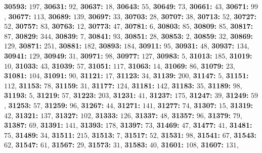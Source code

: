 \textsf{\bfseries 30593:} $197$, \textsf{\bfseries 30631:} $92$, \textsf{\bfseries 30637:} $18$, \textsf{\bfseries 30643:} $55$, \textsf{\bfseries 30649:} $73$, \textsf{\bfseries 30661:} $43$, \textsf{\bfseries 30671:} $99$, \textsf{\bfseries 30677:} $113$, \textsf{\bfseries 30689:} $139$, \textsf{\bfseries 30697:} $33$, \textsf{\bfseries 30703:} $28$, \textsf{\bfseries 30707:} $38$, \textsf{\bfseries 30713:} $52$, \textsf{\bfseries 30727:} $52$, \textsf{\bfseries 30757:} $83$, \textsf{\bfseries 30763:} $12$, \textsf{\bfseries 30773:} $47$, \textsf{\bfseries 30781:} $6$, \textsf{\bfseries 30803:} $85$, \textsf{\bfseries 30809:} $85$, \textsf{\bfseries 30817:} $87$, \textsf{\bfseries 30829:} $344$, \textsf{\bfseries 30839:} $7$, \textsf{\bfseries 30841:} $93$, \textsf{\bfseries 30851:} $28$, \textsf{\bfseries 30853:} $2$, \textsf{\bfseries 30859:} $32$, \textsf{\bfseries 30869:} $129$, \textsf{\bfseries 30871:} $251$, \textsf{\bfseries 30881:} $182$, \textsf{\bfseries 30893:} $184$, \textsf{\bfseries 30911:} $95$, \textsf{\bfseries 30931:} $48$, \textsf{\bfseries 30937:} $134$, \textsf{\bfseries 30941:} $129$, \textsf{\bfseries 30949:} $31$, \textsf{\bfseries 30971:} $98$, \textsf{\bfseries 30977:} $127$, \textsf{\bfseries 30983:} $5$, \textsf{\bfseries 31013:} $185$, \textsf{\bfseries 31019:} $10$, \textsf{\bfseries 31033:} $43$, \textsf{\bfseries 31039:} $57$, \textsf{\bfseries 31051:} $117$, \textsf{\bfseries 31063:} $14$, \textsf{\bfseries 31069:} $86$, \textsf{\bfseries 31079:} $23$, \textsf{\bfseries 31081:} $104$, \textsf{\bfseries 31091:} $90$, \textsf{\bfseries 31121:} $17$, \textsf{\bfseries 31123:} $34$, \textsf{\bfseries 31139:} $200$, \textsf{\bfseries 31147:} $5$, \textsf{\bfseries 31151:} $112$, \textsf{\bfseries 31153:} $78$, \textsf{\bfseries 31159:} $31$, \textsf{\bfseries 31177:} $124$, \textsf{\bfseries 31181:} $142$, \textsf{\bfseries 31183:} $35$, \textsf{\bfseries 31189:} $98$, \textsf{\bfseries 31193:} $5$, \textsf{\bfseries 31219:} $57$, \textsf{\bfseries 31223:} $203$, \textsf{\bfseries 31231:} $41$, \textsf{\bfseries 31237:} $175$, \textsf{\bfseries 31247:} $39$, \textsf{\bfseries 31249:} $59$, \textsf{\bfseries 31253:} $57$, \textsf{\bfseries 31259:} $96$, \textsf{\bfseries 31267:} $44$, \textsf{\bfseries 31271:} $141$, \textsf{\bfseries 31277:} $74$, \textsf{\bfseries 31307:} $15$, \textsf{\bfseries 31319:} $42$, \textsf{\bfseries 31321:} $137$, \textsf{\bfseries 31327:} $102$, \textsf{\bfseries 31333:} $126$, \textsf{\bfseries 31337:} $48$, \textsf{\bfseries 31357:} $96$, \textsf{\bfseries 31379:} $79$, \textsf{\bfseries 31387:} $69$, \textsf{\bfseries 31391:} $141$, \textsf{\bfseries 31393:} $178$, \textsf{\bfseries 31397:} $73$, \textsf{\bfseries 31469:} $47$, \textsf{\bfseries 31477:} $41$, \textsf{\bfseries 31481:} $75$, \textsf{\bfseries 31489:} $34$, \textsf{\bfseries 31511:} $215$, \textsf{\bfseries 31513:} $7$, \textsf{\bfseries 31517:} $52$, \textsf{\bfseries 31531:} $98$, \textsf{\bfseries 31541:} $67$, \textsf{\bfseries 31543:} $62$, \textsf{\bfseries 31547:} $61$, \textsf{\bfseries 31567:} $29$, \textsf{\bfseries 31573:} $31$, \textsf{\bfseries 31583:} $40$, \textsf{\bfseries 31601:} $108$, \textsf{\bfseries 31607:} $131$, 
